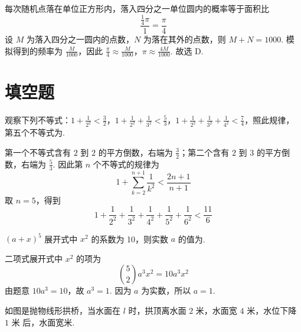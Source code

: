 
\begin{solution}
每次随机点落在单位正方形内，落入四分之一单位圆内的概率等于面积比
\[
\frac{\frac14\pi}{1}=\frac\pi4
\]
设 \(M\) 为落入四分之一圆内的点数，\(N\) 为落在其外的点数，则 \(M+N=1000\). 模拟得到的频率为 \(\frac{M}{1000}\)，因此
\(\frac\pi4\approx\frac{M}{1000}\)，\(\pi\approx\frac{4M}{1000}\).
故选 D.
\end{solution}

\section{填空题}

\begin{problem}
观察下列不等式：\(1 + \frac{1}{2^{2}} < \frac{3}{2}\)，\(1 + \frac{1}{2^{2}} + \frac{1}{3^{2}} < \frac{5}{3}\)，\(1 + \frac{1}{2^{2}} + \frac{1}{3^{2}} + \frac{1}{4^{2}} < \frac{7}{4}\)，照此规律，第五个不等式为\fillinblank{}.
\end{problem}


\begin{solution}
第一个不等式含有 \(2\) 到 \(2\) 的平方倒数，右端为 \(\frac{3}{2}\)；第二个含有 \(2\) 到 \(3\) 的平方倒数，右端为 \(\frac{5}{3}\). 因此第 \(n\) 个不等式的规律为
\[
1+\sum_{k=2}^{n+1}\frac1{k^2}<\frac{2n+1}{n+1}
\]
取 \(n=5\)，得到
\[
1+\frac1{2^2}+\frac1{3^2}+\frac1{4^2}+\frac1{5^2}+\frac1{6^2}<\frac{11}{6}
\]
\end{solution}

\begin{problem}
\((a + x)^{5}\) 展开式中 \(x^{2}\) 的系数为 10，则实数 \(a\) 的值为\fillinblank{}.
\end{problem}


\begin{solution}
二项式展开式中 \(x^2\) 的项为
\[
\binom52a^3x^2=10a^3x^2
\]
由题意 \(10a^3=10\)，故 \(a^3=1\). 因为 \(a\) 为实数，所以 \(a=1\).
\end{solution}

\begin{problem}
如图是抛物线形拱桥，当水面在 \(l\) 时，拱顶离水面 \(2\text{ 米}\)，水面宽 \(4\text{ 米}\)，水位下降 \(1\text{ 米}\) 后，水面宽\fillinblank{}\(\text{米}\).

\end{problem}

